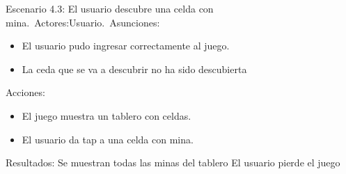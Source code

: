 \documentclass[11pt]{article} %
\begin{document}
Escenario 4.3: El usuario descubre una celda con mina.\
Actores:Usuario.\
Asunciones: 
\begin{itemize}
\item El usuario pudo ingresar correctamente al juego.
\item La ceda que se va a descubrir no ha sido descubierta
\end {itemize}
Acciones:
\begin{itemize}
\item El juego muestra un tablero con celdas.
\item El usuario da tap a una celda con mina. 
\end {itemize}
Resultados:
Se muestran todas las minas del tablero
El usuario pierde el juego
\\ \
\end{document}

